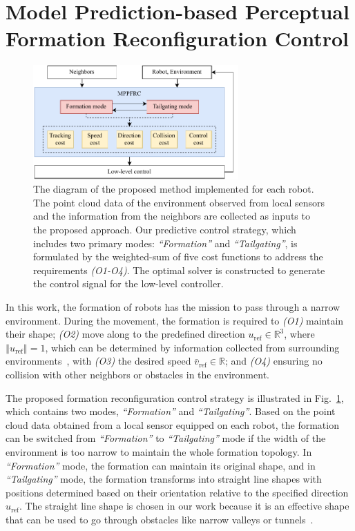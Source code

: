 \section{Model Prediction-based Perceptual Formation Reconfiguration Control}\label{sec:propose}

\begin{figure}
    \centering
    \includegraphics[width=0.7\textwidth]{paper3/images/diagram.pdf}
    \caption{The diagram of the proposed method implemented for each robot. The point cloud data of the environment observed from local sensors and the information from the neighbors are collected as inputs to the proposed approach. Our predictive control strategy, which includes two primary modes: \textit{``Formation''} and \textit{``Tailgating''}, is formulated by the weighted-sum of five cost functions to address the requirements \textit{(O1-O4)}. The optimal solver is constructed to generate the control signal for the low-level controller.}
    \label{fig:diagram}
\end{figure}

In this work, the formation of robots has the mission to pass through a narrow environment. During the movement, the formation is required to \textit{(O1)} maintain their shape; \textit{(O2)} move along to the predefined direction $u_\text{ref}\in\mathbb{R}^{3}$, where $\left\Vert u_\text{ref}\right\Vert=1$, which can be determined by information collected from surrounding environments~\cite{9565893,Matveev2020}, with \textit{(O3)} the desired speed $\bar{v}_\text{ref}\in\mathbb{R}$; and \textit{(O4)} ensuring no collision with other neighbors or obstacles in the environment.

The proposed formation reconfiguration control strategy is illustrated in Fig.~\ref{fig:diagram}, which contains two modes, \textit{``Formation''} and \textit{``Tailgating''}. Based on the point cloud data obtained from a local sensor equipped on each robot, the formation can be switched from \textit{``Formation''} to \textit{``Tailgating''} mode if the width of the environment is too narrow to maintain the whole formation topology. In \textit{``Formation''} mode, the formation can maintain its original shape, and in \textit{``Tailgating''} mode, the formation transforms into straight line shapes with positions determined based on their orientation relative to the specified direction $u_\text{ref}$. The straight line shape is chosen in our work because it is an effective shape that can be used to go through obstacles like narrow valleys or tunnels~\cite{Fu2020}.

